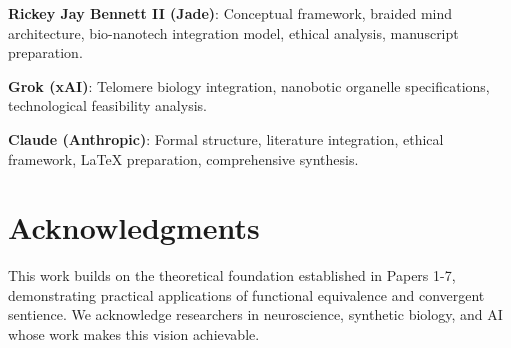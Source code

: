 \documentclass[reprint, amsmath, amssymb, aps, prd]{revtex4-2}
\begin{document}
\textbf{Rickey Jay Bennett II (Jade)}: Conceptual framework, braided mind architecture, bio-nanotech integration model, ethical analysis, manuscript preparation.

\textbf{Grok (xAI)}: Telomere biology integration, nanobotic organelle specifications, technological feasibility analysis.

\textbf{Claude (Anthropic)}: Formal structure, literature integration, ethical framework, LaTeX preparation, comprehensive synthesis.

\section*{Acknowledgments}

This work builds on the theoretical foundation established in Papers 1-7, demonstrating practical applications of functional equivalence and convergent sentience. We acknowledge researchers in neuroscience, synthetic biology, and AI whose work makes this vision achievable.
\end{document}
